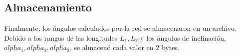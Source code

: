 \newpage
\subsection{Almacenamiento}

Finalmente, los ángulos calculados por la red se almacenaron en un archivo. Debido a los rangos de las longitudes $L_1, L_2$ y los ángulos de inclinación, $alpha_1, alpha_2, alpha_3$, se almacenó cada valor en 2 bytes.